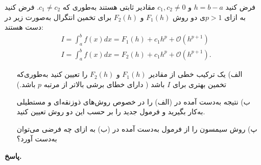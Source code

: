 فرض کنید
\(h = b - a\)
و
\(c_1, c_2 \ne 0\)
مقادیر ثابتی هستند به‌طوری که 
\(c_1 \ne c_2\).
فرض کنید به ازای 
\(p>1\)ی دو روش 
\(F_1(h)\)
و
\(F_2(h)\)
برای تخمین انتگرال به‌صورت زیر در دست هستند:
\begin{align*}
		& I = \int_{a}^{b} f(x)dx = F_1(h) + c_1h^p + \mathcal{O}(h^{p+1})\\
		& I = \int_{a}^{b} f(x)dx = F_2(h) + c_1h^p + \mathcal{O}(h^{p+1}).
\end{align*}
\begin{enumerate}
	\item[الف)] یک ترکیب خطی از مقادیر 
	\(F_1(h)\)
	و
	\(F_2(h)\)
	را تعیین کنید به‌طوری‌که تخمین بهتری برای 
\(I\)
باشد ( دارای خطای برشی بالاتر از مرتبه 
\(p\)
باشد.)
	\item[ب)] 
نتیجه به‌دست آمده در (الف) را در خصوص روش‌های ذوزنقه‌ای و مستطیلی به‌کار بگیرید و فرمول جدید را بر حسب این دو روش تعیین کنید.
\item[پ)] 
روش سیمسون را از فرمول به‌دست آمده در (ب) به ازای چه فرضی می‌توان به‌دست آورد؟
\end{enumerate}

\vspace*{-.3cm}

\begin{answer}

	\textbf{پاسخ.}
	
\end{answer}
